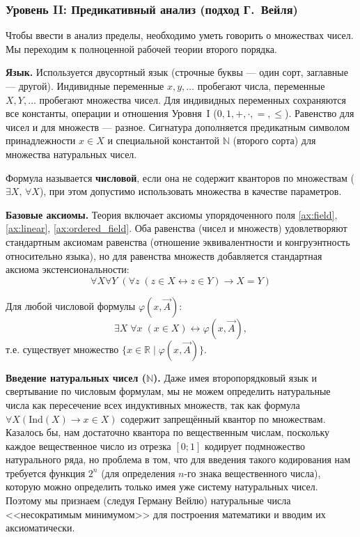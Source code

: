 \documentclass[11pt, a4paper]{extarticle}
\newcommand{\ph}{\varphi}
\newcommand{\R}{{\mathbb R}}
\newcommand{\N}{{\mathbb N}}
\renewcommand{\le}{\leqslant}
\begin{document}
\subsubsection{Уровень II: Предикативный анализ (подход Г.~Вейля)}

Чтобы ввести в анализ пределы, необходимо уметь говорить о множествах чисел. Мы переходим к полноценной рабочей теории второго порядка.

\smallskip\noindent\textbf{Язык.} Используется двусортный язык (строчные буквы --- один сорт, заглавные --- другой). 
Индивидные переменные $x,y,\ldots$ пробегают числа, переменные $X,Y,\ldots$ пробегают множества чисел. Для индивидных переменных сохраняются все константы, операции и отношения Уровня~I ($0, 1, +, \cdot, =,\le$). Равенство для чисел и для множеств --- разное.
Сигнатура дополняется предикатным символом принадлежности $x \in X$ и специальной константой $\N$ (второго сорта) для множества натуральных чисел.

Формула называется \textbf{числовой}, если она не содержит кванторов по множествам ($\exists X,\,\forall X$), при этом допустимо использовать множества в качестве параметров.


\smallskip\noindent\textbf{Базовые аксиомы.} Теория включает аксиомы упорядоченного поля \ref{ax:field}, \ref{ax:linear}, \ref{ax:ordered_field}. Оба равенства (чисел и множеств) удовлетворяют стандартным аксиомам равенства (отношение эквивалентности и конгруэнтность относительно языка), но для равенства множеств добавляется стандартная аксиома экстенсиональности:
\[
\forall X \forall Y\; (\forall z\; (z \in X \leftrightarrow z \in Y) \to X = Y)
\]

\begin{axiom}\label{ax:comprehension}
Для любой числовой формулы $\ph(x, \vec A)$:
$$
\exists X\;\forall x\; (x\in X)\leftrightarrow\ph(x, \vec A),
$$
т.е. существует множество $\{x \in \R \mid \ph(x, \vec A)\}$.
\end{axiom}

\smallskip\noindent\textbf{Введение натуральных чисел ($\N$).} 
Даже имея второпорядковый язык и свертывание по числовым формулам, мы не можем определить натуральные числа как пересечение всех индуктивных множеств, так как формула $\forall X (\text{Ind}(X) \to x \in X)$ содержит запрещённый квантор по множествам. Казалось бы, нам достаточно квантора по вещественным числам, поскольку каждое вещественное число из отрезка $[0;1]$ кодирует подмножество натурального ряда, но проблема в том, что для введения такого кодирования нам требуется функция $2^n$ (для определения $n$-го знака вещественного числа), которую можно определить только имея уже систему натуральных чисел. Поэтому мы признаем (следуя Герману Вейлю) натуральные числа <<несократимым минимумом>> для построения математики и вводим их аксиоматически.
\end{document}
